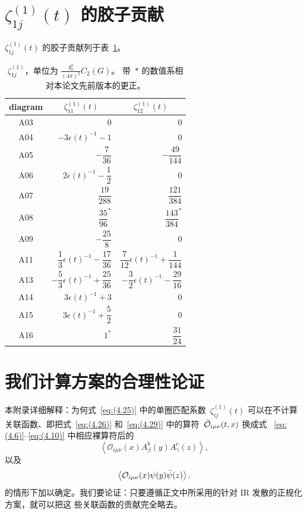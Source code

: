 \section{$\zeta_{1j}^{(1)}(t)$ 的胶子贡献}
\label{sec:C}
$\zeta_{1j}^{(1)}(t)$ 的胶子贡献列于表~\ref{table:0}。
\begin{table}
\caption{$\zeta_{1j}^{(1)}$，单位为 $\frac{g_0^2}{(4\pi)^2}C_2(G)$。
带~$*$ 的数值系相对本论文先前版本的更正。
}
\label{table:0}
\begin{center}
\renewcommand{\arraystretch}{2.2}
\setlength{\tabcolsep}{20pt}
\begin{tabular}{crr}
\toprule
 diagram & \multicolumn{1}{c}{$\zeta_{11}^{(1)}(t)$}
 & \multicolumn{1}{c}{$\zeta_{12}^{(1)}(t)$} \\
\midrule
 A03  & $0$ & $0$ \\
 A04  & $-3\epsilon(t)^{-1}-1$ & $0$ \\
 A05  & $-\dfrac{7}{36}$ & $-\dfrac{49}{144}$ \\
 A06  & $2\epsilon(t)^{-1}-\dfrac{1}{2}$ & $0$ \\
 A07  & $\dfrac{19}{288}$ & $\dfrac{121}{384}$ \\
 A08  & $\dfrac{35}{96}^*$ & $\dfrac{143}{384}^*$ \\
 A09  & $-\dfrac{25}{8}$ & $0$ \\
 A11  & $\dfrac{1}{3}\epsilon(t)^{-1}-\dfrac{17}{36}$ & $\dfrac{7}{12}\epsilon(t)^{-1}+\dfrac{1}{144}$ \\
 A13  & $-\dfrac{5}{3}\epsilon(t)^{-1}+\dfrac{25}{36}$ & $-\dfrac{3}{2}\epsilon(t)^{-1}-\dfrac{29}{16}$ \\
 A14  & $3\epsilon(t)^{-1}+3$ & $0$ \\
 A15  & $3\epsilon(t)^{-1}+\dfrac{5}{2}$ & $0$ \\
 A16  & $1^*$ & $\dfrac{31}{24}$ \\
\bottomrule
\end{tabular}
\end{center}
\end{table}

\section{我们计算方案的合理性论证}
\label{sec:D}
本附录详细解释：为何式~\eqref{eq:(4.25)} 中的单圈匹配系数~$\zeta^{(1)}_{ij}(t)$
可以在不计算关联函数、即把式~\eqref{eq:(4.26)} 和~\eqref{eq:(4.29)}
中的算符~$\Tilde{\mathcal{O}}_{i\mu\nu}(t,x)$ 换成式%
~\eqref{eq:(4.6)}--\eqref{eq:(4.10)} 中相应裸算符后的
\begin{equation}
   \left\langle\mathcal{O}_{i\mu\nu}(x)
   A_\beta^b(y)A_\gamma^c(z)\right\rangle,
\label{eq:(D1)}
\end{equation}
以及
\begin{equation}
   \left\langle\mathcal{O}_{i\mu\nu}(x)
   \psi(y)\Bar{\psi}(z)\right\rangle.
\label{eq:(D2)}
\end{equation}
的情形下加以确定。我们要论证：只要遵循正文中所采用的针对 IR 发散的正规化方案，就可以把这
些关联函数的贡献完全略去。

